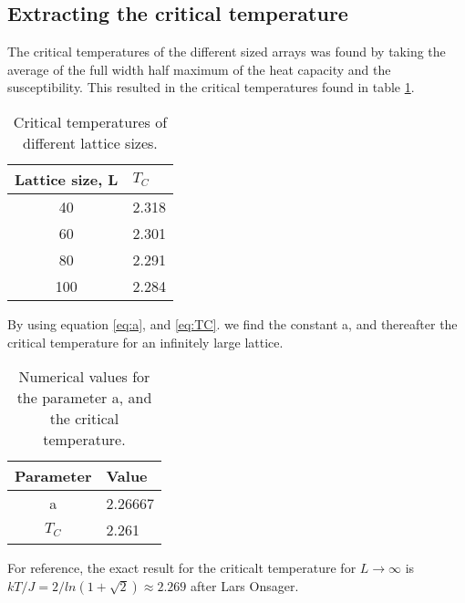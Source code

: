 \documentclass[../main.tex]{subfiles}
\begin{document}

\subsection{Extracting the critical temperature}
The critical temperatures of the different sized arrays was found by taking the average of the full width half maximum of the heat capacity and the susceptibility. This resulted in the critical temperatures found in table \ref{tab:results-TC-lattices}.
\begin{table}[!h]
  \begin{center}
    \begin{tabular}{|c| l|}
      \hline
      Lattice size, L & $T_C$ \\
      \hline
      40 & 2.318\\
      60 & 2.301\\
      80 & 2.291\\
      100 & 2.284\\
      \hline
    \end{tabular}
    \caption{Critical temperatures of different lattice sizes.}
    \label{tab:results-TC-lattices}
  \end{center}
\end{table}
\FloatBarrier
By using equation \eqref{eq:a}, and \eqref{eq:TC}. we find the constant a, and thereafter the critical temperature for an infinitely large lattice.

\begin{table}[!h]
  \begin{center}
    \begin{tabular}{|c| l|}
      \hline
      Parameter & Value \\
      \hline
      a & 2.26667\\
      $T_C$ & 2.261\\
      \hline
    \end{tabular}
    \caption{Numerical values for the parameter a, and the critical temperature.}
    \label{tab:results-a-and-TC}
  \end{center}
\end{table}
\FloatBarrier

For reference, the exact result for the criticalt temperature for $L \rightarrow \infty$ is $kT/J = 2/ln(1 +\sqrt{2}) \approx 2.269$ after Lars Onsager.\cite{larsonsager}
\end{document}
